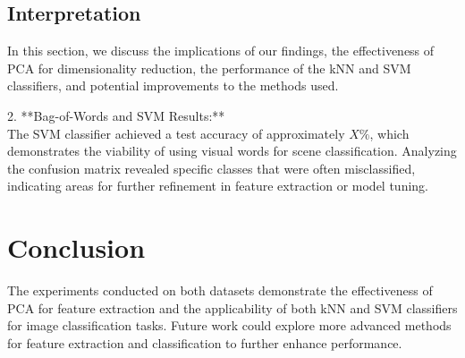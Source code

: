 \documentclass{article}
\begin{document}
\subsection{Interpretation}
In this section, we discuss the implications of our findings, the effectiveness of PCA for dimensionality reduction, the performance of the kNN and SVM classifiers, and potential improvements to the methods used. 

2. **Bag-of-Words and SVM Results:** \\
   The SVM classifier achieved a test accuracy of approximately \( X\% \), which demonstrates the viability of using visual words for scene classification. Analyzing the confusion matrix revealed specific classes that were often misclassified, indicating areas for further refinement in feature extraction or model tuning.

\section{Conclusion}
The experiments conducted on both datasets demonstrate the effectiveness of PCA for feature extraction and the applicability of both kNN and SVM classifiers for image classification tasks. Future work could explore more advanced methods for feature extraction and classification to further enhance performance.


\nocite{*}


\end{document}
